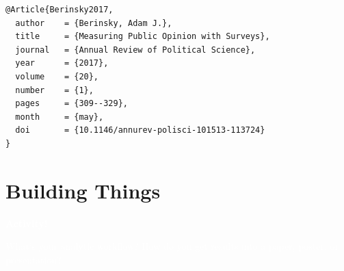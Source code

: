 \documentclass[14pt]{beamer}
\begin{document}
\frame{}



\begin{frame}[fragile]

\small

\begin{verbatim}
@Article{Berinsky2017,
  author    = {Berinsky, Adam J.},
  title     = {Measuring Public Opinion with Surveys},
  journal   = {Annual Review of Political Science},
  year      = {2017},
  volume    = {20},
  number    = {1},
  pages     = {309--329},
  month     = {may},
  doi       = {10.1146/annurev-polisci-101513-113724}
}
\end{verbatim}

\end{frame}




\section[Building]{Building Things}
\frame{\tableofcontents[currentsection]}

\bgroup
{}
\begin{frame}[plain]{}

\textcolor{white}{\Huge \textbf{Activity!}}

\vspace{2em}

\textcolor{white}{What's your analytic workflow? How do you get results into a paper, poster, or presentation?}

\end{frame}
\egroup
\end{document}
